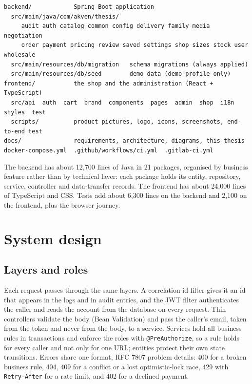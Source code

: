 \begin{lstlisting}[caption={Repository layout}, label=src:layout]
backend/            Spring Boot application
  src/main/java/com/akven/thesis/
     audit auth catalog common config delivery family media negotiation
     order payment pricing review saved settings shop sizes stock user wholesale
  src/main/resources/db/migration   schema migrations (always applied)
  src/main/resources/db/seed        demo data (demo profile only)
frontend/           the shop and the administration (React + TypeScript)
  src/api  auth  cart  brand  components  pages  admin  shop  i18n  styles  test
  scripts/          product pictures, logo, icons, screenshots, end-to-end test
docs/               requirements, architecture, diagrams, this thesis
docker-compose.yml  .github/workflows/ci.yml  .gitlab-ci.yml
\end{lstlisting}

The backend has about 12,700 lines of Java in 21 packages, organised by business feature rather than by technical
layer: each package holds its entity, repository, service, controller and data-transfer records. The frontend has about
24,000 lines of TypeScript and CSS. Tests add about 6,300 lines on the backend and 2,100 on the frontend, plus the
browser journey.

\section{System design}
\label{sec:design-sys}

\subsection{Layers and roles}

Each request passes through the same layers. A correlation-id filter gives it an id that appears in the logs and in
audit entries, and the JWT filter authenticates the caller and reads the account from the database on every request.
Thin controllers validate the body (Bean Validation) and pass the caller's email, taken from the token and never from
the body, to a service. Services hold all business rules in transactions and enforce the roles with
\texttt{@PreAuthorize}, so a rule holds for every caller and not only for one URL; entities protect their own state
transitions. Errors share one format, RFC 7807 problem details: 400 for a broken business rule, 404, 409 for a conflict
or a lost optimistic-lock race, 429 with \texttt{Retry-After} for a rate limit, and 402 for a declined payment.

